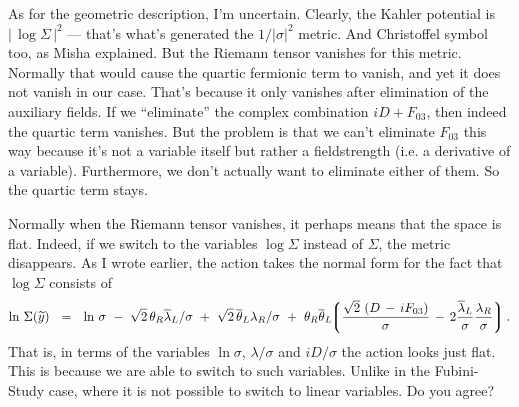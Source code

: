 \documentclass[epsfig,12pt]{article}
\def\beq{\begin{equation}}
\def\eeq{\end{equation}}
\newcommand{\wt}{\widetilde}
\newcommand{\ov}{\overline}
\newcommand{\lgr}{\left\lgroup}
\newcommand{\rgr}{\right\rgroup}
\begin{document}
	As for the geometric description, I'm uncertain. Clearly, the Kahler potential is 
	$ |\, \log \Sigma \,|^2 $ --- that's what's generated the $ 1/|\sigma|^2 $ metric. 
	And Christoffel symbol too, as Misha explained. 
	But the Riemann tensor vanishes for this metric. 
	Normally that would cause the quartic fermionic term to vanish, and yet it does not vanish in our case. 
	That's because it only vanishes after elimination of the auxiliary fields. 
	If we ``eliminate'' the complex combination $ iD + F_{03} $, then indeed the quartic term vanishes. 
	But the problem is that we can't eliminate $ F_{03} $ this way because it's not a variable 
	itself but rather a fieldstrength (i.e. a derivative of a variable).
	Furthermore, we don't actually want to eliminate either of them.
	So the quartic term stays.

	Normally when the Riemann tensor vanishes, it perhaps means that the space is flat. 
	Indeed, if we switch to the variables $ \log \Sigma $ instead of $ \Sigma $, the metric disappears.
	As I wrote earlier, the action takes the normal form for the fact that $ \log \Sigma $ consists of
\beq
	\ln\, \Sigma(\wt y) ~~=~~ \ln\,\sigma 
			~-~ \sqrt{2}\, \theta_R \ov\lambda{}_L / \sigma
			~+~ \sqrt{2}\, \ov\theta{}_L \lambda_R / \sigma
			~+~ \theta_R \ov\theta{}_L \!\!
			    \lgr
				\frac{ \sqrt{2}\, \left( D \,-\, i F_{03} \right) }{ \sigma }
				\,-\,
				2 \frac{\ov\lambda{}_L}{\sigma} \frac{\lambda_R}{\sigma}
			    \rgr.
\eeq
	That is, in terms of the variables $ \ln \sigma $, $ \lambda/\sigma $ and $ iD/\sigma $ the action
	looks just flat. This is because we are able to switch to such variables. 
	Unlike in the Fubini-Study case, where it is not possible to switch to linear variables.
	Do you agree?
\end{document}
